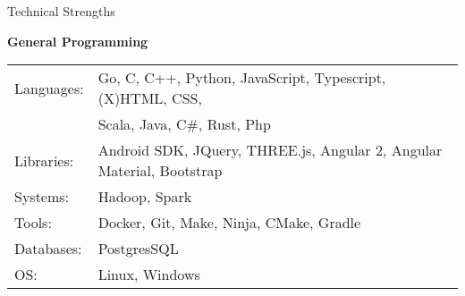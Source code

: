 \documentclass{resume} %
\newcommand{\btab}[2]{
	\bgroup
	\def\arraystretch{#1}
	\begin{tabular}{#2}
}
\newcommand{\etab}{
	\end{tabular} \smallskip
	\egroup
}
\begin{document}

\begin{rSection}{Technical Strengths}

{\bf General Programming}

\btab{1.1}{ l l }
	Languages: &  Go, C, C++, Python, JavaScript, Typescript, (X)HTML, CSS, \\
	& Scala, Java, C\#, Rust, Php \\
	Libraries: & Android SDK, JQuery, THREE.js, Angular 2, Angular Material, Bootstrap \\
	Systems: & Hadoop, Spark \\
	Tools: & Docker, Git, Make, Ninja, CMake, Gradle \\
	Databases: & PostgresSQL \\
	OS: & Linux, Windows \\
\etab

\end{rSection}
\end{document}
